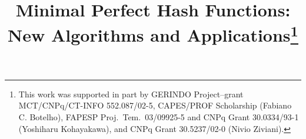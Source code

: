 %
%
%
%
%
%
\documentclass[twocolumn,fleqn,runningheads]{svjour2}
%
\smartqed  %
%
\usepackage{graphicx}
\usepackage{listings}
%
%
%
%


\def\cG{{\mathcal G}}
\def\crit{{\rm crit}}
\def\ncrit{{\rm ncrit}}
\def\scrit{{\rm scrit}}
\def\bedges{{\rm bedges}}
\def\ZZ{{\mathbb Z}}

%


\title{Minimal Perfect Hash Functions: New Algorithms and Applications\thanks{
This work was supported in part by
GERINDO Project--grant MCT/CNPq/CT-INFO 552.087/02-5,
CAPES/PROF Scholarship (Fabiano C. Botelho),
FAPESP Proj.\ Tem.\ 03/09925-5 and CNPq Grant 30.0334/93-1
(Yoshiharu Kohayakawa),
and CNPq Grant 30.5237/02-0 (Nivio Ziviani).}
}

